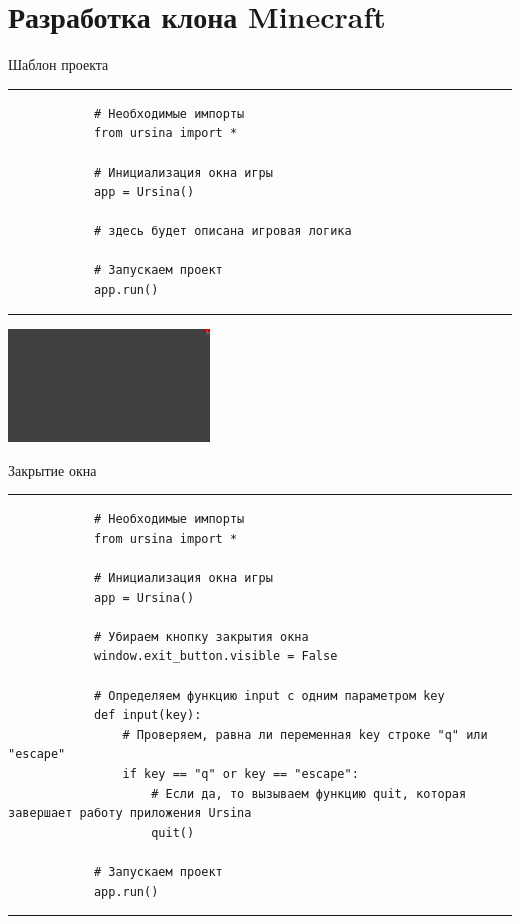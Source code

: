 \documentclass[handout]{beamer}
\begin{document}
    \section{Разработка клона Minecraft}
    \begin{frame}[fragile]{Шаблон проекта}
        \scriptsize
        \rule{\textwidth}{1pt}
        \begin{verbatim}
            # Необходимые импорты
            from ursina import *
            
            # Инициализация окна игры
            app = Ursina() 
            
            # здесь будет описана игровая логика
            
            # Запускаем проект
            app.run()
        \end{verbatim}
        \rule{\textwidth}{1pt}
        \begin{center}
            \includegraphics[width=0.4\textwidth]{img/1.png}
        \end{center}
    \end{frame}

    \begin{frame}[fragile]{Закрытие окна}
        \scriptsize
        \rule{\textwidth}{1pt}
        \begin{verbatim}
            # Необходимые импорты
            from ursina import *
            
            # Инициализация окна игры
            app = Ursina()
            
            # Убираем кнопку закрытия окна
            window.exit_button.visible = False
            
            # Определяем функцию input с одним параметром key
            def input(key):
                # Проверяем, равна ли переменная key строке "q" или "escape"
                if key == "q" or key == "escape":
                    # Если да, то вызываем функцию quit, которая завершает работу приложения Ursina
                    quit()
            
            # Запускаем проект
            app.run()
        \end{verbatim}
        \rule{\textwidth}{1pt}
    \end{frame}
\end{document}
